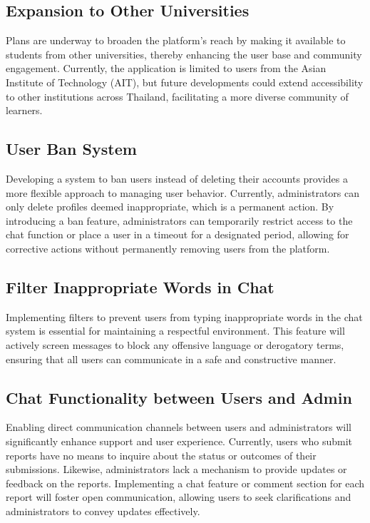     \subsection{Expansion to Other Universities}
    Plans are underway to broaden the platform's reach by making it available to students from other universities, thereby enhancing the user base and community engagement. Currently, the application is limited to users from the Asian Institute of Technology (AIT), but future developments could extend accessibility to other institutions across Thailand, facilitating a more diverse community of learners.
    
    \subsection{User Ban System}
    Developing a system to ban users instead of deleting their accounts provides a more flexible approach to managing user behavior. Currently, administrators can only delete profiles deemed inappropriate, which is a permanent action. By introducing a ban feature, administrators can temporarily restrict access to the chat function or place a user in a timeout for a designated period, allowing for corrective actions without permanently removing users from the platform.
    
    \subsection{Filter Inappropriate Words in Chat}
    Implementing filters to prevent users from typing inappropriate words in the chat system is essential for maintaining a respectful environment. This feature will actively screen messages to block any offensive language or derogatory terms, ensuring that all users can communicate in a safe and constructive manner.
    
    \subsection{Chat Functionality between Users and Admin}
    Enabling direct communication channels between users and administrators will significantly enhance support and user experience. Currently, users who submit reports have no means to inquire about the status or outcomes of their submissions. Likewise, administrators lack a mechanism to provide updates or feedback on the reports. Implementing a chat feature or comment section for each report will foster open communication, allowing users to seek clarifications and administrators to convey updates effectively.
    
